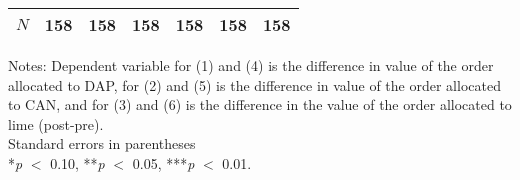 \begin{table}[htbp]
\begin{threeparttable}
\begin{tabular}{l cccccc}
$N$                 &         158   &         158   &         158   &         158   &         158   &         158   \\
\hline
\hline
\end{tabular}
\begin{tablenotes}
\footnotesize
\item{Notes: Dependent variable for (1) and (4) is the difference in value of the order allocated to DAP, for (2) and (5) is the difference in value of the order allocated to CAN, and for (3) and (6) is the difference in the value of the order allocated to lime (post-pre). \\ Standard errors in parentheses \\ *\textit{p} $<$ 0.10, **\textit{p} $<$ 0.05, ***\textit{p} $<$ 0.01.}
\end{tablenotes}
\end{threeparttable}
\end{table}
